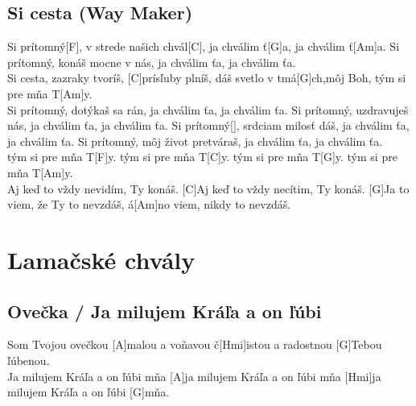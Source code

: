 \documentclass[10pt]{article}
\begin{document}
\begin{Large}
\begin{minipage}{\textwidth}
	\subsection{Si cesta (Way Maker)}
	\begin{multicols}{2}
		\begin{guitar}
			Si prítomný[F], v strede našich chvál[C],
			ja chválim ť[G]a, ja chválim ť[Am]a.
			Si prítomný, konáš mocne v nás, 
			ja chválim ťa, ja chválim ťa.
			\\
			[F]Si cesta, zazraky tvoríš, 
			[C]prísľuby plníš, 
			dáš svetlo v tmá[G]ch,môj Boh, 
			tým si pre mňa T[Am]y.
			\\
			Si prítomný, dotýkaš sa rán, 
			ja chválim ťa, ja chválim ťa.
			Si prítomný, uzdravuješ nás, 
			ja chválim ťa, ja chválim ťa.
			\columnbreak
			Si prítomný[], srdciam milosť dáš, 
			ja chválim ťa, ja chválim ťa.
			Si prítomný, môj život pretváraš, 
			ja chválim ťa, ja chválim ťa.
			\\ 
			tým si pre mňa T[F]y. 
			tým si pre mňa T[C]y. 
			tým si pre mňa T[G]y. 
			tým si pre mňa T[Am]y.
			\\
			[F]Aj keď to vždy nevidím, Ty konáš.
			[C]Aj keď to vždy necítim, Ty konáš.
			[G]Ja to viem, že Ty to nevzdáš,
			á[Am]no viem, nikdy to nevzdáš.
		\end{guitar}
	\end{multicols}
\end{minipage}


\newpage

\begin{minipage}{\textwidth}
\section{Lamačské chvály}
\begin{multicols}{2}
\subsection{Ovečka / Ja milujem Kráľa a on ľúbi}
\begin{guitar}	
	[D]Som Tvojou ovečkou	
	[A]malou a voňavou	
	č[Hmi]istou a radostnou 
	[G]Tebou ľúbenou.
	\\
	[D]Ja milujem Kráľa a on ľúbi mňa
	[A]ja milujem Kráľa a on ľúbi mňa
	[Hmi]ja milujem Kráľa a on ľúbi [G]mňa.
\end{guitar}
\columnbreak

\end{multicols}
\end{minipage}
\end{Large}
\end{document}
